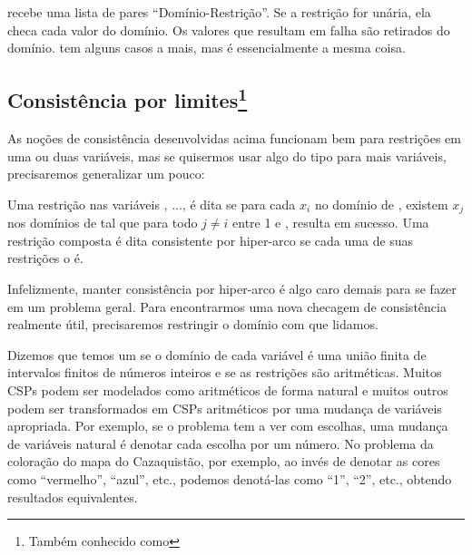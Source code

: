     \begin{listing}
\inputminted{prolog}{../Exemplos/Cap9/arc_consistency.pl}\label{lst:arc_consistency}
    \end{listing}

 recebe uma lista de pares ``Domínio-Restrição''. Se a restrição for unária, ela checa cada valor do domínio.
Os valores que resultam em falha são retirados do domínio.  tem alguns casos a mais, mas é essencialmente a mesma coisa.

\subsection{Consistência por limites\footnote{Também conhecido como }}

As noções de consistência desenvolvidas acima funcionam bem para restrições em uma ou duas variáveis,
mas se quisermos usar algo do tipo para mais variáveis, precisaremos generalizar um pouco:

\begin{definition}
  Uma restrição  nas variáveis , ...,  é dita 
  se para cada $x_i$ no domínio de , existem $x_j$ nos domínios de  tal que
  para todo $j \neq i$ entre 1 e ,  resulta em
  sucesso. Uma restrição composta é dita consistente por hiper-arco se cada uma de suas restrições o é.
\end{definition}

Infelizmente, manter consistência por hiper-arco é algo caro demais para se fazer em um problema geral. Para
encontrarmos uma nova checagem de consistência realmente útil, precisaremos restringir o domínio com que lidamos.

Dizemos que temos um  se o domínio de cada variável é uma união
finita de intervalos finitos de números inteiros e se as restrições são aritméticas. Muitos CSPs
podem ser modelados como aritméticos de forma natural e muitos outros podem ser transformados em
CSPs aritméticos por uma mudança de variáveis apropriada.
Por exemplo, se o problema tem a ver com escolhas, uma mudança de variáveis natural é denotar cada
escolha por um número. No problema da coloração do mapa do Cazaquistão, por exemplo, ao invés de
denotar as cores como ``vermelho'', ``azul'', etc., podemos denotá-las como ``1'', ``2'', etc., obtendo resultados equivalentes.

